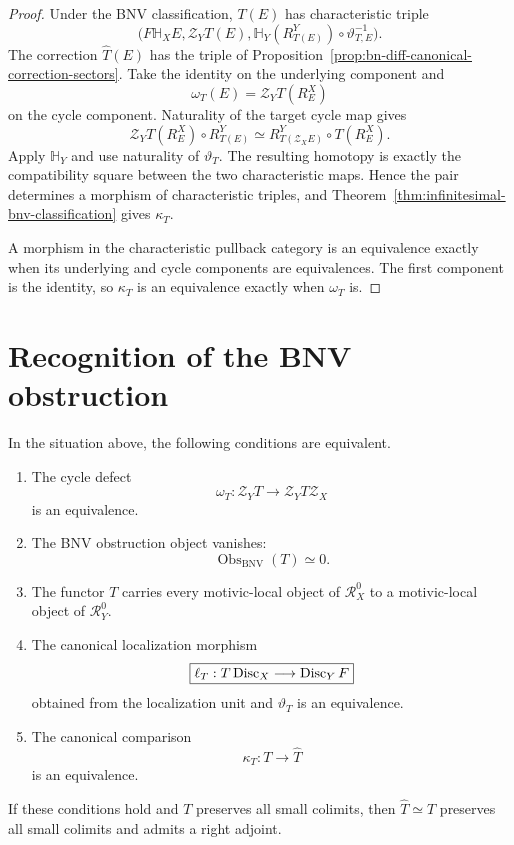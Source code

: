 \begin{proof}
Under the BNV classification, \(T(E)\) has characteristic triple
\[
  \bigl(
    F\mathbb H_XE,
    \mathcal Z_YT(E),
    \mathbb H_Y(R^Y_{T(E)})\circ\vartheta_{T,E}^{-1}
  \bigr).
\]
The correction \(\widehat T(E)\) has the triple of
Proposition~\ref{prop:bn-diff-canonical-correction-sectors}.  Take the identity
on the underlying component and
\[
  \omega_T(E)=\mathcal Z_YT(R_E^X)
\]
on the cycle component.  Naturality of the target cycle map gives
\[
  \mathcal Z_YT(R_E^X)\circ R^Y_{T(E)}
  \simeq
  R^Y_{T(\mathcal Z_XE)}\circ T(R_E^X).
\]
Apply \(\mathbb H_Y\) and use naturality of \(\vartheta_T\).  The resulting
homotopy is exactly the compatibility square between the two characteristic
maps.  Hence the pair determines a morphism of characteristic triples, and
Theorem~\ref{thm:infinitesimal-bnv-classification} gives \(\kappa_T\).

A morphism in the characteristic pullback category is an equivalence exactly
when its underlying and cycle components are equivalences.  The first component
is the identity, so \(\kappa_T\) is an equivalence exactly when \(\omega_T\) is.
\end{proof}

\section{Recognition of the BNV obstruction}
\label{sec:bn-diff-bnv-obstruction-recognition}

\begin{theorem}
\label{thm:bn-diff-bnv-obstruction}
In the situation above, the following conditions are equivalent.
\begin{enumerate}
\item The cycle defect
\[
  \omega_T:
  \mathcal Z_YT\longrightarrow\mathcal Z_YT\mathcal Z_X
\]
is an equivalence.
\item The BNV obstruction object vanishes:
\[
  \operatorname{Obs}_{\mathrm{BNV}}(T)\simeq0.
\]
\item The functor \(T\) carries every motivic-local object of
\(\mathcal R_X^0\) to a motivic-local object of \(\mathcal R_Y^0\).
\item The canonical localization morphism
\[
  \boxed{
  \ell_T:
  T\operatorname{Disc}_X
  \longrightarrow
  \operatorname{Disc}_YF
  }
\]
obtained from the localization unit and \(\vartheta_T\) is an equivalence.
\item The canonical comparison
\[
  \kappa_T:T\longrightarrow\widehat T
\]
is an equivalence.
\end{enumerate}
If these conditions hold and \(T\) preserves all small colimits, then
\(\widehat T\simeq T\) preserves all small colimits and admits a right adjoint.
\end{theorem}

